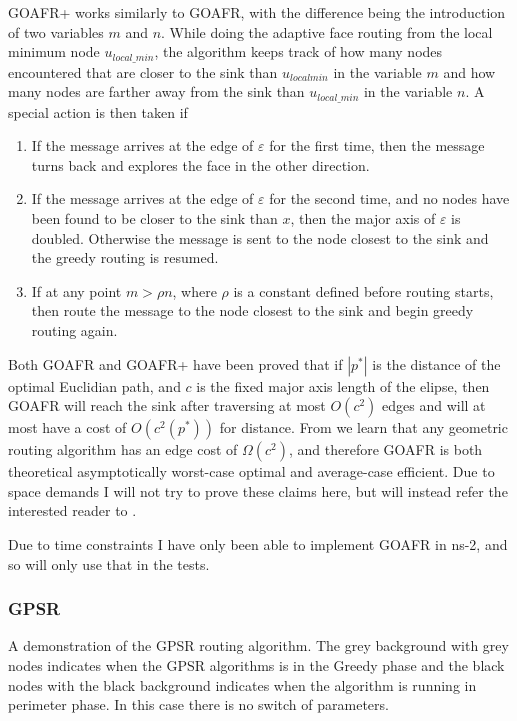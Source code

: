 GOAFR+ works similarly to GOAFR, with the difference being the introduction of two variables $m$ and $n$. While doing the adaptive face routing from the local minimum node $u_{local\_ min}$, the algorithm keeps track of how many nodes encountered that are closer to the sink than $u_{local min}$ in the variable $m$ and how many nodes are farther away from the sink than $u_{local\_min}$ in the variable $n$.
A special action is then taken if
\begin{enumerate}
\item If the message arrives at the edge of $\varepsilon$ for the first time, then the message turns back and explores the face in the other direction. 
\item If the message arrives at the edge of $\varepsilon$ for the second time, and no nodes have been found to be closer to the sink than $x$, then the major axis of $\varepsilon$ is doubled. Otherwise the message is sent to the node closest to the sink and the greedy routing is resumed.
\item If at any point $m > \rho n$, where $\rho$ is a constant defined before routing starts, then route the message to the node closest to the sink and begin greedy routing again.
\end{enumerate}

Both GOAFR and GOAFR+ have been proved that if $|p^*|$ is the distance of the optimal Euclidian path, and $c$ is the fixed major axis length of the elipse, then GOAFR will reach the sink after traversing at most $O(c^2)$ edges and will at most have a cost of $O(c^2(p^*))$ for distance. From \cite{asymp} we learn that any geometric routing algorithm has an edge cost of  $\Omega(c^2)$, and therefore GOAFR is both theoretical asymptotically worst-case optimal and average-case efficient. Due to space demands I will not try to prove these claims here, but will instead refer the interested reader to \cite{gopher+, asymp, gopher}.

Due to time constraints I have only been able to implement GOAFR in ns-2, and so will only use that in the tests.

\subsubsection{GPSR}
{A demonstration of the GPSR routing algorithm. The grey background with grey nodes indicates when the GPSR algorithms is in the Greedy phase and the black nodes with the black background indicates when the algorithm is running in perimeter phase. In this case there is no switch of parameters.}

